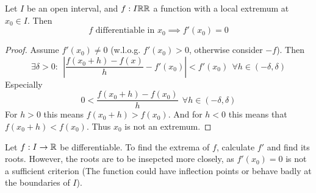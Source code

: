 \documentclass[../../script.tex]{subfiles}
\begin{document}
\begin{thm}
    Let $I$ be an open interval, and $f: I \mathbb{R} \mathbb{R}$ a function with a local extremum at $x_0 \in I$. Then
    \[
        f \text{ differentiable in } x_0 \implies f'(x_0) = 0
    \]
\end{thm}
\begin{proof}
    Assume $f'(x_0) \ne 0$ (w.l.o.g. $f'(x_0) > 0$, otherwise consider $-f$). Then 
    \begin{equation}
        \exists \delta > 0: ~~\left| \frac{f(x_0 + h) - f(x)}{h} - f'(x_0) \right| < f'(x_0) ~~\forall h \in (-\delta, \delta)
    \end{equation}
    Especially 
    \begin{equation}
        0 < \frac{f(x_0 + h) - f(x_0)}{h} ~~\forall h \in (-\delta, \delta)
    \end{equation}
    For $h > 0$ this means $f(x_0 + h) > f(x_0)$. And for $h < 0$ this means that $f(x_0 + h) < f(x_0)$. Thus $x_0$ is not an extremum.
\end{proof}

\begin{rem}
    Let $f: I \rightarrow \mathbb{R}$ be differentiable. To find the extrema of $f$, calculate $f'$ and find its roots. 
    However, the roots are to be insepcted more closely, as $f'(x_0) = 0$ is not a sufficient criterion (The function could have inflection points or behave badly at the boundaries of $I$).
\end{rem}
\end{document}

